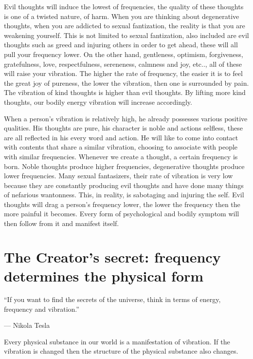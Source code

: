 \documentclass[
]{book}
\begin{document}
Evil thoughts will induce the lowest of frequencies, the quality of these thoughts is one of a twisted nature, of harm. When you are thinking about degenerative thoughts, when you are addicted to sexual fantization, the reality is that you are weakening yourself. This is not limited to sexual fantization, also included are evil thoughts such as greed and injuring others in order to get ahead, these will all pull your frequency lower. On the other hand, gentleness, optimism, forgiveness, gratefulness, love, respectfulness, sereneness, calmness and joy, etc.., all of these will raise your vibration. The higher the rate of frequency, the easier it is to feel the great joy of pureness, the lower the vibration, then one is surrounded by pain. The vibration of kind thoughts is higher than evil thoughts. By lifting more kind thoughts, our bodily energy vibration will increase accordingly.

When a person's vibration is relatively high, he already possesses various positive qualities. His thoughts are pure, his character is noble and actions selfless, these are all reflected in his every word and action. He will like to come into contact with contents that share a similar vibration, choosing to associate with people with similar frequencies. Whenever we create a thought, a certain frequency is born. Noble thoughts produce higher frequencies, degenerative thoughts produce lower frequencies. Many sexual fantasizers, their rate of vibration is very low because they are constantly producing evil thoughts and have done many things of nefarious wantonness. This, in reality, is sabotaging and injuring the self. Evil thoughts will drag a person's frequency lower, the lower the frequency then the more painful it becomes. Every form of psychological and bodily symptom will then follow from it and manifest itself.

\hypertarget{the-creators-secret-frequency-determines-the-physical-form}{%
\section{The Creator's secret: frequency determines the physical form}\label{the-creators-secret-frequency-determines-the-physical-form}}

``If you want to find the secrets of the universe, think in terms of energy, frequency and vibration.''

--- Nikola Tesla

Every physical substance in our world is a manifestation of vibration.
If the vibration is changed then the structure of the physical substance also changes.
\end{document}
